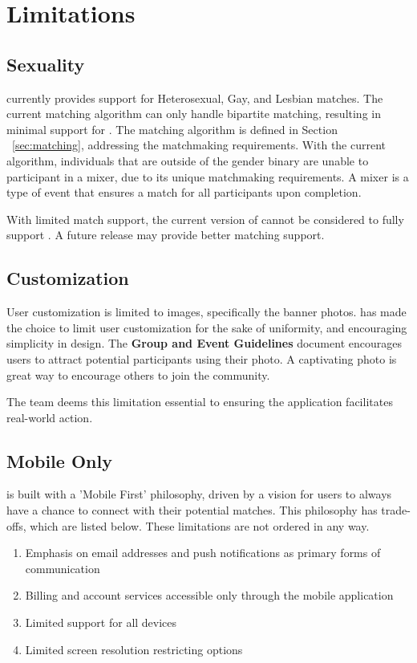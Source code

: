\section{Limitations}
\label{sec:limitations}

\subsection{Sexuality}
\label{sec:limit_sexuality}

\Friending{} currently provides support for Heterosexual, Gay, and Lesbian matches. The current matching algorithm can only handle bipartite matching, resulting in minimal support for . The matching algorithm is defined in Section ~\ref{sec:matching}, addressing the matchmaking requirements. With the current algorithm, individuals that are outside of the gender binary are unable to participant in a mixer, due to its unique matchmaking requirements. A mixer is a type of event that ensures a match for all participants upon completion.

With limited match support, the current version of \Friending{} cannot be considered to fully support . A future release may provide better matching support.

\subsection{Customization}
\label{sec:limit_questions}

User customization is limited to images, specifically the banner photos. \Friending{} has made the choice to limit user customization for the sake of uniformity, and encouraging simplicity in design. The \textbf{Group and Event Guidelines} document encourages users to attract potential participants using their photo. A captivating photo is great way to encourage others to join the community.

The \Friending{} team deems this limitation essential to ensuring the application facilitates real-world action.

\subsection{Mobile Only}
\label{sec:limit_mobile}

\Friending{} is built with a 'Mobile First' philosophy, driven by a vision for users to always have a chance to connect with their potential matches. This philosophy has trade-offs, which are listed below. These limitations are not ordered in any way.

\begin{enumerate}
\item Emphasis on email addresses and push notifications as primary forms of communication
\item Billing and account services accessible only through the mobile application
\item Limited support for all devices
\item Limited screen resolution restricting  options
\end{enumerate}